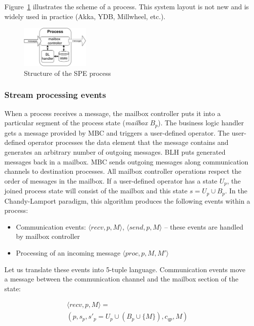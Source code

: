 Figure~\ref{fig:spe_process} illustrates the scheme of a process. This system layout is not new and is widely used in practice (Akka, YDB, Millwheel, etc.).

\begin{figure}[t]
  \centering
  \includegraphics[width=0.3\textwidth]{pics/process-scheme.pdf}
  \caption{Structure of the SPE process}
  \label{fig:spe_process}
\end{figure}

\subsubsection{Stream processing events}

When a process receives a message, the mailbox controller puts it into a particular segment of the process state ({\em mailbox} $B_p$). The business logic handler gets a message provided by MBC and triggers a user-defined operator. The user-defined operator processes the data element that the message contains and generates an arbitrary number of outgoing messages. BLH puts generated messages back in a mailbox. MBC sends outgoing messages along communication channels to destination processes. All mailbox controller operations respect the order of messages in the mailbox. If a user-defined operator has a state $U_p$, the joined process state will consist of the mailbox and this state $s=U_p \cup B_p$. In the Chandy-Lamport paradigm, this algorithm produces the following events within a process:
\begin{itemize}
    \item Communication events: $\langle recv, p, M\rangle$, $\langle send, p, M \rangle$ -- these events are handled by mailbox controller
    \item Processing of an incoming message $\langle proc, p, M, M' \rangle$
\end{itemize}

Let us translate these events into 5-tuple language. Communication events move a message between the communication channel and the mailbox section of the state:

\begin{multline}
\langle recv, p, M\rangle = \\ (p, s_p, s'_p = U_p \cup \left(B_p \cup \{M\}\right), c_{qp}, M)
\end{multline}

